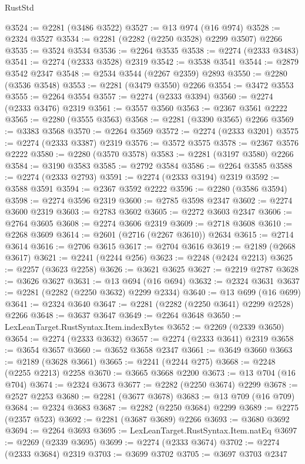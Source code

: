 \begin{lexlean}{RustStd}
\begin{coremodule}
@3524 := @2281 (@3486 @3522)
@3527 := @13 @974 (@16 @974)
@3528 := @2324 @3527
@3534 := @2281 (@2282 (@2250 @3528) @2299 @3507) @2266
@3535 := @3524 @3534
@3536 := @2264 @3535
@3538 := @2274 (@2333 @3483)
@3541 := @2274 (@2333 @3528) @2319
@3542 := @3538 @3541
@3544 := @2879 @3542 @2347
@3548 := @2534 @3544 (@2267 @2359) @2893
@3550 := @2280 (@3536 @3548)
@3553 := @2281 (@3479 @3550) @2266
@3554 := @3472 @3553
@3555 := @2264 @3554
@3557 := @2274 (@2333 @3394)
@3560 := @2274 (@2333 @3476) @2319
@3561 := @3557 @3560
@3563 := @2367 @3561 @2222
@3565 := @2280 (@3555 @3563)
@3568 := @2281 (@3390 @3565) @2266
@3569 := @3383 @3568
@3570 := @2264 @3569
@3572 := @2274 (@2333 @3201)
@3575 := @2274 (@2333 @3387) @2319
@3576 := @3572 @3575
@3578 := @2367 @3576 @2222
@3580 := @2280 (@3570 @3578)
@3583 := @2281 (@3197 @3580) @2266
@3584 := @3190 @3583
@3585 := @2792 @3584
@3586 := @2264 @3585
@3588 := @2274 (@2333 @2793)
@3591 := @2274 (@2333 @3194) @2319
@3592 := @3588 @3591
@3594 := @2367 @3592 @2222
@3596 := @2280 (@3586 @3594)
@3598 := @2274 @3596 @2319
@3600 := @2785 @3598 @2347
@3602 := @2274 @3600 @2319
@3603 := @2783 @3602
@3605 := @2272 @3603 @2347
@3606 := @2764 @3605
@3608 := @2274 @3606 @2319
@3609 := @2718 @3608
@3610 := @2268 @3609
@3614 := @2601 (@2716 (@2267 @3610)) @2634
@3615 := @2714 @3614
@3616 := @2706 @3615
@3617 := @2704 @3616
@3619 := @2189 (@2668 @3617)
@3621 := @2241 (@2244 @256)
@3623 := @2248 (@2424 @2213)
@3625 := @2257 (@3623 @2258)
@3626 := @3621 @3625
@3627 := @2219 @2787
@3628 := @3626 @3627
@3631 := @13 @694 (@16 @694)
@3632 := @2324 @3631
@3637 := @2281 (@2282 (@2250 @3632) @2299 @2334)
@3640 := @13 @699 (@16 @699)
@3641 := @2324 @3640
@3647 := @2281 (@2282 (@2250 @3641) @2299 @2528) @2266
@3648 := @3637 @3647
@3649 := @2264 @3648
@3650 := LexLeanTarget.RustSyntax.Item.indexBytes
@3652 := @2269 (@2339 @3650)
@3654 := @2274 (@2333 @3632)
@3657 := @2274 (@2333 @3641) @2319
@3658 := @3654 @3657
@3660 := @3652 @3658 @2347
@3661 := @3649 @3660
@3663 := @2189 (@3628 @3661)
@3665 := @2241 (@2244 @275)
@3668 := @2248 (@2255 @2213) @2258
@3670 := @3665 @3668 @2200
@3673 := @13 @704 (@16 @704)
@3674 := @2324 @3673
@3677 := @2282 (@2250 @3674) @2299
@3678 := @2527 @2253
@3680 := @2281 (@3677 @3678)
@3683 := @13 @709 (@16 @709)
@3684 := @2324 @3683
@3687 := @2282 (@2250 @3684) @2299
@3689 := @2275 (@2357 @523)
@3692 := @2281 (@3687 @3689) @2266
@3693 := @3680 @3692
@3694 := @2264 @3693
@3695 := LexLeanTarget.RustSyntax.Item.natEq
@3697 := @2269 (@2339 @3695)
@3699 := @2274 (@2333 @3674)
@3702 := @2274 (@2333 @3684) @2319
@3703 := @3699 @3702
@3705 := @3697 @3703 @2347

\end{coremodule}
\end{lexlean}
